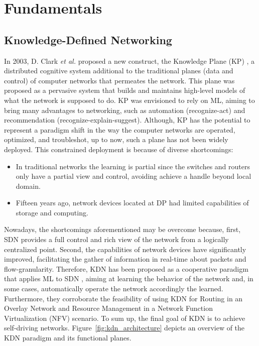 \section{Fundamentals}
\label{sec:background-kdn}

\subsection{Knowledge-Defined Networking}
\label{subsec:background-kdn}
In 2003, D. Clark \textit{et al.} proposed a new construct, the Knowledge Plane (KP) \cite{clark_2003:knowledge_plane}, a distributed cognitive system additional to the traditional planes (data and control) of computer networks that permeates the network. This plane was proposed as a pervasive system that builds and maintains high-level models of what the network is supposed to do. KP was envisioned to rely on ML, aiming to bring many advantages to networking, such as automation (recognize-act) and recommendation (recognize-explain-suggest). Although, KP has the potential to represent a paradigm shift in the way the computer networks are operated, optimized, and troubleshot, up to now, such a plane has not been widely deployed. This constrained deployment is because of diverse shortcomings:

\begin{itemize}
    \item In traditional networks the learning is partial since the switches and routers only have a partial view and control, avoiding achieve a handle beyond local domain.
    \item Fifteen years ago, network devices located at DP had limited capabilities of storage and computing.
\end{itemize}{}

Nowadays, the shortcomings aforementioned may be overcome because, first, SDN provides a full control and rich view of the network from a logically centralized point. Second, the capabilities of network devices have significantly improved, facilitating the gather of information in real-time about packets and flow-granularity. Therefore, KDN has been proposed as a cooperative paradigm that applies ML to SDN \cite{mestres_2017:KDN}, aiming at learning the behavior of the network and, in some cases, automatically operate the network accordingly the learned. Furthermore, they corroborate the feasibility of using KDN for Routing in an Overlay Network and Resource Management in a Network Function Virtualization (NFV) scenario. To sum up, the final goal of KDN is to achieve self-driving networks. Figure~\ref{fig:kdn_architecture} depicts an overview of the KDN paradigm and its functional planes.

